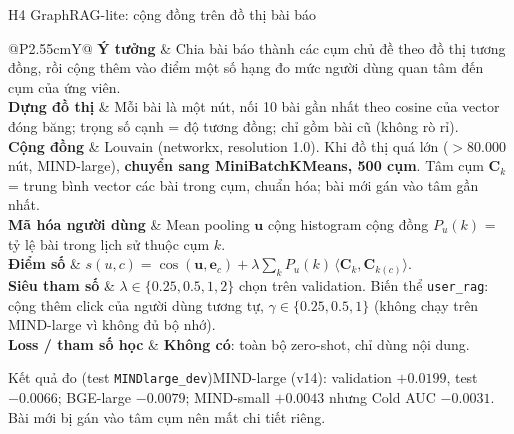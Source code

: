 \documentclass[aspectratio=169,t]{beamer}
\makeatletter
\newcommand{\code}[1]{\texttt{#1}}
\newcommand{\bangmota}[1]{{\scriptsize\renewcommand{\arraystretch}{1.1}\setlength{\tabcolsep}{4pt}%
  \begin{tabularx}{\textwidth}{@{}P{2.55cm}Y@{}}\toprule #1 \bottomrule\end{tabularx}}}
\newcommand{\rw}[2]{\textbf{#1} & #2\\ \midrule}
\newcommand{\rwl}[2]{\textbf{#1} & #2\\}
\newcommand{\ketqua}[1]{\begin{exampleblock}{Kết quả đo (test \code{MINDlarge\_dev})}\scriptsize #1\end{exampleblock}}
\makeatother
\begin{document}
\begin{frame}[shrink]{H4 \textperiodcentered{} GraphRAG-lite: cộng đồng trên đồ thị bài báo}
\bangmota{
\rw{Ý tưởng}{Chia bài báo thành các cụm chủ đề theo đồ thị tương đồng, rồi cộng thêm vào điểm một số hạng đo mức người dùng quan tâm đến cụm của ứng viên.}
\rw{Dựng đồ thị}{Mỗi bài là một nút, nối 10 bài gần nhất theo cosine của vector đóng băng; trọng số cạnh = độ tương đồng; chỉ gồm bài cũ (không rò rỉ).}
\rw{Cộng đồng}{Louvain (networkx, resolution 1.0). Khi đồ thị quá lớn ($>80.000$ nút, MIND-large), \textbf{chuyển sang MiniBatchKMeans, 500 cụm}. Tâm cụm $\mathbf C_k$ = trung bình vector các bài trong cụm, chuẩn hóa; bài mới gán vào tâm gần nhất.}
\rw{Mã hóa người dùng}{Mean pooling $\mathbf u$ cộng histogram cộng đồng $P_u(k)$ = tỷ lệ bài trong lịch sử thuộc cụm $k$.}
\rw{Điểm số}{$s(u,c)=\cos(\mathbf u,\mathbf e_c)+\lambda\sum_k P_u(k)\,\langle\mathbf C_k,\mathbf C_{k(c)}\rangle$.}
\rw{Siêu tham số}{$\lambda\in\{0.25,0.5,1,2\}$ chọn trên validation. Biến thể \code{user\_rag}: cộng thêm click của người dùng tương tự, $\gamma\in\{0.25,0.5,1\}$ (không chạy trên MIND-large vì không đủ bộ nhớ).}
\rwl{Loss / tham số học}{\textbf{Không có}: toàn bộ zero-shot, chỉ dùng nội dung.}
}
\ketqua{MIND-large (v14): validation $+0.0199$, test $-0.0066$; BGE-large $-0.0079$; MIND-small $+0.0043$ nhưng Cold AUC $-0.0031$. Bài mới bị gán vào tâm cụm nên mất chi tiết riêng.}
\par\kern0pt
\end{frame}
\end{document}
